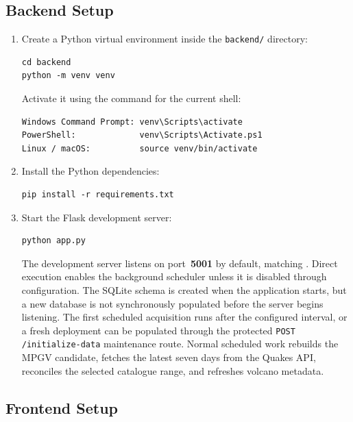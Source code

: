 \documentclass[12pt]{article}
\begin{document}
\subsection*{Backend Setup}

\begin{enumerate}
    \item Create a Python virtual environment inside the \texttt{backend/} directory:
\begin{verbatim}
cd backend
python -m venv venv
\end{verbatim}

Activate it using the command for the current shell:
\begin{verbatim}
Windows Command Prompt: venv\Scripts\activate
PowerShell:             venv\Scripts\Activate.ps1
Linux / macOS:          source venv/bin/activate
\end{verbatim}

    \item Install the Python dependencies:
\begin{verbatim}
pip install -r requirements.txt
\end{verbatim}

    \item Start the Flask development server:
\begin{verbatim}
python app.py
\end{verbatim}

The development server listens on port~\textbf{5001} by default, matching . Direct execution enables the background scheduler unless it is disabled through configuration. The SQLite schema is created when the application starts, but a new database is not synchronously populated before the server begins listening. The first scheduled acquisition runs after the configured interval, or a fresh deployment can be populated through the protected \texttt{POST /initialize-data} maintenance route. Normal scheduled work rebuilds the MPGV candidate, fetches the latest seven days from the Quakes API, reconciles the selected catalogue range, and refreshes volcano metadata.
\end{enumerate}

\subsection*{Frontend Setup}
\end{document}
